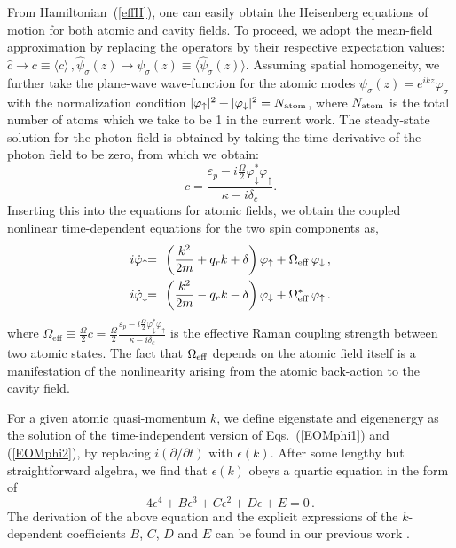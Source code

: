 \documentclass[atoms,article,submit,moreauthors,pdftex,12pt,a4paper]{mdpi}
\def\ba{\begin{eqnarray}}
\def\ea{\end{eqnarray}}
\begin{document}
From Hamiltonian~(\ref{effH}), one can easily obtain the Heisenberg equations of motion for both atomic and cavity fields. To proceed, we adopt the mean-field approximation by replacing the operators by their respective expectation values: $\hat{c} \rightarrow c\equiv \langle \hat{c} \rangle \,, \hat{\psi}_\sigma ({z}) \rightarrow  \psi_\sigma (z)\equiv \langle \hat{\psi}_\sigma ({z}) \rangle $. 
Assuming spatial homogeneity, we further take the plane-wave wave-function for the atomic modes $\psi_\sigma({z})=e^{i{k} {z}}\varphi_\sigma$ with the normalization condition $|\varphi_\uparrow|^2+|\varphi_\downarrow|^2=N_{\rm atom}$, where $N_{\rm atom}$ is the total number of atoms which we take to be 1 in the current work. The steady-state solution for the photon field is obtained by taking the time derivative of the photon field to be zero, from which we obtain:
\begin{equation}
c = \frac{\varepsilon_{p}-i\frac{\Omega}{2} \varphi_\downarrow^\ast\varphi_\uparrow}{\kappa-i\delta_{c}}.
\label{c}
\end{equation}
Inserting this into the equations for atomic fields, we obtain the coupled nonlinear time-dependent equations for the two spin components as, 
\ba
i\dot{\varphi}_{\uparrow}&\!\! =\!\! & \left(\frac{{k}^{2}}{2m}+q_{r}k+\delta\right) \varphi_{\uparrow}+ \Omega_{\rm eff}\, \varphi_{\downarrow} \,,\label{EOMphi1}\\
i\dot{\varphi}_{\downarrow} & \!\!= \!\!& \left(\frac{{k}^{2}}{2m}-q_{r}k-\delta\right)\varphi_{\downarrow}+ \Omega^*_{\rm eff}\,\varphi_{\uparrow}\,.\label{EOMphi2}
\ea
where $\Omega_\text{eff} \equiv \frac{\Omega}{2} c = \frac{\Omega}{2} \frac{\varepsilon_{p}-i\frac{\Omega}{2} \varphi_\downarrow^\ast\varphi_\uparrow}{\kappa-i\delta_{c}} $ is the effective Raman coupling strength between two atomic states. The fact that $\Omega_{\rm eff}$ depends on the atomic field itself is a manifestation of the nonlinearity arising from the atomic back-action to the cavity field. 

For a given atomic quasi-momentum ${k}$, we define eigenstate and eigenenergy as the solution of the time-independent version of Eqs.~(\ref{EOMphi1}) and (\ref{EOMphi2}), by replacing $i(\partial/\partial t)$ with $\epsilon({k})$. After some lengthy but straightforward algebra, we find that $\epsilon({ k})$ obeys a quartic equation in the form of
\begin{equation}
4\epsilon^4+B\epsilon^3+C\epsilon^2+D\epsilon+E=0 \,.
\label{generalquarticEq}
\end{equation}
The derivation of the above equation and the explicit expressions of the $k$-dependent coefficients $B$, $C$, $D$ and $E$ can be found in our previous work \cite{cavitySOC}. 
\end{document}
